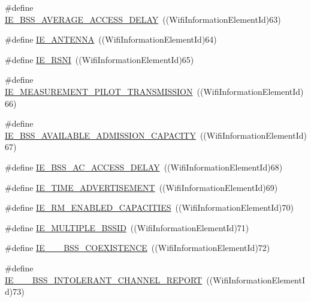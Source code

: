 \begin{DoxyCompactItemize}
\#define \hyperlink{wifi-information-element_8h_a25ef678842ec3e3ede572158f35a241e}{I\+E\+\_\+\+B\+S\+S\+\_\+\+A\+V\+E\+R\+A\+G\+E\+\_\+\+A\+C\+C\+E\+S\+S\+\_\+\+D\+E\+L\+AY}~((Wifi\+Information\+Element\+Id)63)
\item 
\#define \hyperlink{wifi-information-element_8h_a38bc1a54abb898d24f6bbd9d94cc1ecc}{I\+E\+\_\+\+A\+N\+T\+E\+N\+NA}~((Wifi\+Information\+Element\+Id)64)
\item 
\#define \hyperlink{wifi-information-element_8h_a27927b173f4f5bb2479138eec1a29251}{I\+E\+\_\+\+R\+S\+NI}~((Wifi\+Information\+Element\+Id)65)
\item 
\#define \hyperlink{wifi-information-element_8h_afcf3f68f97d108e87416113461e883f8}{I\+E\+\_\+\+M\+E\+A\+S\+U\+R\+E\+M\+E\+N\+T\+\_\+\+P\+I\+L\+O\+T\+\_\+\+T\+R\+A\+N\+S\+M\+I\+S\+S\+I\+ON}~((Wifi\+Information\+Element\+Id)66)
\item 
\#define \hyperlink{wifi-information-element_8h_af4618a2802d5cfd671d8dfa44c54c593}{I\+E\+\_\+\+B\+S\+S\+\_\+\+A\+V\+A\+I\+L\+A\+B\+L\+E\+\_\+\+A\+D\+M\+I\+S\+S\+I\+O\+N\+\_\+\+C\+A\+P\+A\+C\+I\+TY}~((Wifi\+Information\+Element\+Id)67)
\item 
\#define \hyperlink{wifi-information-element_8h_a37e63800ebef1bc0bb138fab879d4abd}{I\+E\+\_\+\+B\+S\+S\+\_\+\+A\+C\+\_\+\+A\+C\+C\+E\+S\+S\+\_\+\+D\+E\+L\+AY}~((Wifi\+Information\+Element\+Id)68)
\item 
\#define \hyperlink{wifi-information-element_8h_a69542ab8fa95ff714416f7b70c39e5b8}{I\+E\+\_\+\+T\+I\+M\+E\+\_\+\+A\+D\+V\+E\+R\+T\+I\+S\+E\+M\+E\+NT}~((Wifi\+Information\+Element\+Id)69)
\item 
\#define \hyperlink{wifi-information-element_8h_a6adf4922f2e05ebd2e9ed6a582aa81cc}{I\+E\+\_\+\+R\+M\+\_\+\+E\+N\+A\+B\+L\+E\+D\+\_\+\+C\+A\+P\+A\+C\+I\+T\+I\+ES}~((Wifi\+Information\+Element\+Id)70)
\item 
\#define \hyperlink{wifi-information-element_8h_a7159b392ceedbe2b0f6a4c99cff5cf9c}{I\+E\+\_\+\+M\+U\+L\+T\+I\+P\+L\+E\+\_\+\+B\+S\+S\+ID}~((Wifi\+Information\+Element\+Id)71)
\item 
\#define \hyperlink{wifi-information-element_8h_ace958eaa72bf127aeba15d98ccb818b2}{I\+E\+\_\+\_\+\_\+\+B\+S\+S\+\_\+\+C\+O\+E\+X\+I\+S\+T\+E\+N\+CE}~((Wifi\+Information\+Element\+Id)72)
\item 
\#define \hyperlink{wifi-information-element_8h_a4d4abf507380bac64d2248dab9baf62b}{I\+E\+\_\+\_\+\_\+\+B\+S\+S\+\_\+\+I\+N\+T\+O\+L\+E\+R\+A\+N\+T\+\_\+\+C\+H\+A\+N\+N\+E\+L\+\_\+\+R\+E\+P\+O\+RT}~((Wifi\+Information\+Element\+Id)73)

\end{DoxyCompactItemize}
